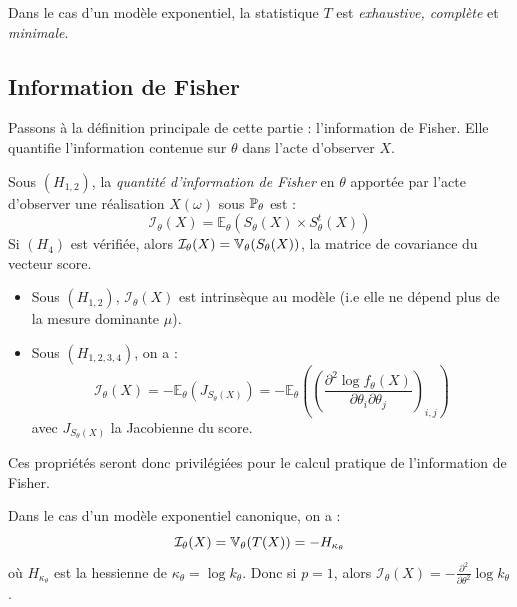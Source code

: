 \begin{prop}
    Dans le cas d'un modèle exponentiel, la statistique $T$ est \emph{exhaustive, complète} et 
    \emph{minimale}.
\end{prop}

\subsection{Information de Fisher}

Passons à la définition principale de cette partie : l'information de Fisher. Elle quantifie 
l'information contenue sur $ \theta$ dans l'acte d'observer $X$. 

\begin{definition}
    Sous $(H_{1,2})$, la \emph{quantité d'information de Fisher} en $ \theta$ apportée par l'acte d'observer 
    une réalisation $X( \omega)$ sous $ \mathbb{P}_\theta$ est : 
    \begin{equation}
        \boxed{\mathcal{I}_\theta(X) = \mathbb{E}_\theta(S_\theta(X) \times S_\theta^t(X))}
    \end{equation}
    Si $(H_4)$ est vérifiée, alors $ \mathcal{I}_\theta(X) = \mathbb{V}_\theta(S_\theta(X))$, la 
    matrice de covariance du vecteur score. 
\end{definition}

\begin{prop}
    \begin{itemize}
        \item Sous $(H_{1,2})$, $ \mathcal{I}_\theta(X)$ est intrinsèque au modèle (i.e elle ne dépend plus de 
        la mesure dominante $ \mu$). 
        \item Sous $(H_{1,2,3,4})$, on a : 
        $$ 
            \boxed{
            \mathcal{I}_\theta(X) = - \mathbb{E}_\theta(J_{S_\theta(X)}) 
            = - \mathbb{E}_\theta \left( \left( \frac{\partial ^2 \log f_\theta(X)}{\partial \theta_i \partial \theta_j}\right)_{i,j}\right)
            }
        $$
        avec $J_{S_\theta(X)}$ la Jacobienne du score. 
    \end{itemize}
\end{prop}

Ces propriétés seront donc privilégiées pour le calcul pratique de l'information de Fisher. 

\begin{prop}
    Dans le cas d'un modèle exponentiel canonique, on a : 
        $$ \mathcal{I}_\theta(X) = \mathbb{V}_\theta(T(X)) = - H_{ \kappa_\theta} $$
    où $ H_{ \kappa_\theta}$ est la hessienne de $ \kappa_\theta = \log k_\theta$. 
    Donc si $ p = 1$, alors $ \mathcal{I}_\theta(X) = - \frac{ \partial ^2}{ \partial \theta^2} \log k_\theta$. 
\end{prop}


